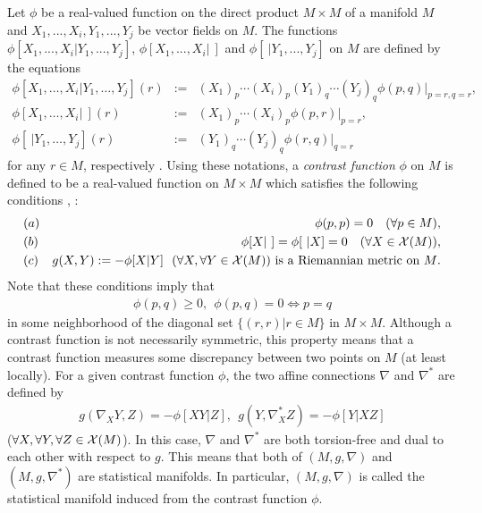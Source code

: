 \documentclass[graybox]{svmult}
\begin{document}
Let $\phi$ be a real-valued function on the direct product $M \times M$ of a manifold $M$
and $X_1,...,X_i,Y_1,...,Y_j$ be vector fields on $M$. The functions
$\phi[X_1,...,X_i|Y_1,...,Y_j]$, $\phi[X_1,...,X_i| \ ]$ and $\phi[ \ |Y_1,...,Y_j]$ on
$M$ are defined by the equations
%
\begin{eqnarray}
   \phi[X_1,\ldots,X_i | Y_1,\ldots,Y_j](r) &:=&
   (X_1)_p \cdots (X_i)_p(Y_1)_q \cdots (Y_j)_q\phi(p,q)|_{p=r,q=r}, \label{Eguchi1} \\
   \phi[X_1,\ldots,X_i | \ ](r) &:=&
   (X_1)_p \cdots (X_i)_p\phi(p,r)|_{p=r}, \label{Eguchi2} \\
   \phi[ \ |Y_1,\ldots,Y_j](r) &:=&
   (Y_1)_q \cdots (Y_j)_q\phi(r,q)|_{q=r} \label{Eguchi3}
\end{eqnarray}
%
for any $r \in M$, respectively \cite{E}.
Using these notations, a {\em contrast function} $\phi$ on $M$ is defined to be a real-valued
function on $M \times M$ which satisfies the following conditions \cite{E}, \cite{Ma1}:
%
\begin{eqnarray*}
   &(a)& \phi(p,p) = 0 \ \ \ (\forall p \in M), \\
   &(b)& \phi[X| \ ] = \phi[ \ |X] = 0 \ \ \ (\forall X \in {\cal X}(M)), \\
   &(c)& \mbox{$g(X,Y) := -\phi[X|Y] \ \ (\forall X, \forall Y \in {\cal X}(M))$
               is a Riemannian metric on $M$}.
\end{eqnarray*}
%
Note that these conditions imply that
%
\begin{eqnarray*}
   \phi(p,q) \ge 0, \ \ \phi(p,q) = 0 \Longleftrightarrow p=q
\end{eqnarray*}
%
in some neighborhood of the diagonal set $\{(r,r) | r \in M\}$ in $M \times M$.
Although a contrast function is not necessarily symmetric, this property means that
a contrast function measures some discrepancy between two points on $M$ (at least locally).
For a given contrast function $\phi$, the two affine connections $\nabla$ and $\nabla^{\ast}$ 
are defined by
%
\begin{eqnarray*}
   g(\nabla_{X}Y,Z) = -\phi[XY|Z], \ \
   g(Y,\nabla^{\ast}_{X}Z) = -\phi[Y|XZ]
\end{eqnarray*}
%
($\forall X, \forall Y, \forall Z \in {\cal X}(M)$).
In this case, $\nabla$ and $\nabla^{\ast}$ are both torsion-free and dual to each other with
respect to $g$. This means that both of $(M,g,\nabla)$ and $(M,g,\nabla^{\ast})$ are statistical
manifolds. In particular, $(M,g,\nabla)$ is called the statistical manifold induced from the
contrast function $\phi$.
\end{document}
